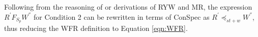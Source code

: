\documentclass[journal,compsoc]{IEEEtran}
\begin{document}
  Following from the reasoning of or derivations of  RYW and MR, the expression $R^{'}  F_{S_p} W^{''} $ for Condition 2 can be rewritten in terms of ConSpec as  $R^{'}  \preccurlyeq_{\mathit{st}+w} W^{''}$,  thus reducing the WFR definition to Equation \ref{eqn:WFR}. 
\end{document}
